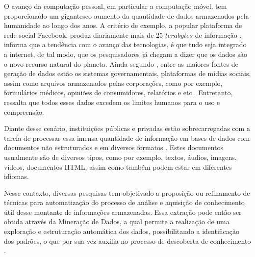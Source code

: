 
O avanço da computação pessoal, em particular a computação móvel, tem proporcionado um gigantesco
aumento da quantidade de dados armazenados pela humanidade ao longo dos anos. A critério de exemplo,
a popular plataforma de rede social Facebook\footnotemark, produz diariamente mais de 25 $terabytes$
de informação \cite{Havens2012}.  informa que a tendência com o avanço das
tecnologias, é que tudo seja integrado a internet, de tal modo, que os pesquisadores já chegam a
dizer que os dados são o novo recurso natural do planeta. Ainda segundo ,
entre as maiores fontes de geração de dados estão os sistemas governamentais, plataformas de mídias
sociais, assim como arquivos armazenados pelas corporações, como por exemplo, formulários médicos,
opiniões de consumidores, relatórios e etc.. Entretanto,  ressalta que 
todos esses dados excedem os limites humanos para o uso e compreensão.

Diante desse cenário, instituições públicas e privadas estão sobrecarregadas com a tarefa de
processar essa imensa quantidade de informação em bases de dados com documentos não estruturados e
em diversos formatos \cite{Kobayashi2008}. Estes documentos usualmente são de diversos tipos,
como por exemplo, textos, áudios, imagens, vídeos, documentos HTML, assim como também podem estar 
em diferentes idiomas.

Nesse contexto, diversas pesquisas tem objetivado a proposição ou refinamento de técnicas para
automatização do processo de análise e aquisição de conhecimento útil desse montante de informações
armazenadas. Essa extração pode então ser obtida através da Mineração de Dados, a qual permite a
realização de uma exploração e estruturação automática dos dados, possibilitando a identificação dos
padrões, o que por sua vez auxilia no processo de descoberta de conhecimento \cite{Nogueira2013}.

